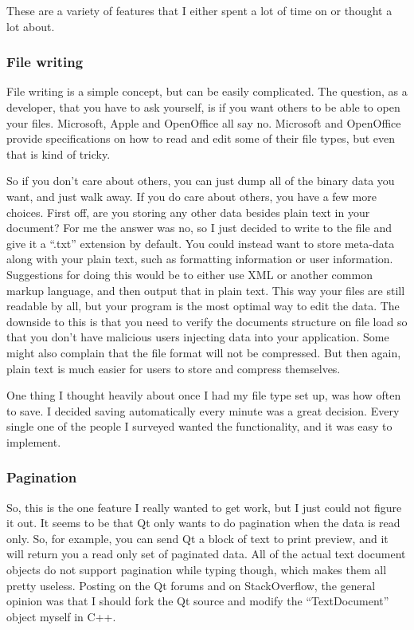\documentclass[10pt]{article}
\begin{document}
These are a variety of features that I either spent a lot of time on or thought a lot about.

\subsubsection{File writing}

File writing is a simple concept, but can be easily complicated. The question, as a developer, that you have to ask yourself, is if you want others to be able to open your files. Microsoft, Apple and OpenOffice all say no. Microsoft and OpenOffice provide specifications on how to read and edit some of their file types, but even that is kind of tricky.

So if you don't care about others, you can just dump all of the binary data you want, and just walk away. If you do care about others, you have a few more choices. First off, are you storing any other data besides plain text in your document? For me the answer was no, so I just decided to write to the file and give it a ``.txt'' extension by default. You could instead want to store meta-data along with your plain text, such as formatting information or user information. Suggestions for doing this would be to either use XML or another common markup language, and then output that in plain text. This way your files are still readable by all, but your program is the most optimal way to edit the data. The downside to this is that you need to verify the documents structure on file load so that you don't have malicious users injecting data into your application. Some might also complain that the file format will not be compressed. But then again, plain text is much easier for users to store and compress themselves.

One thing I thought heavily about once I had my file type set up, was how often to save. I decided saving automatically every minute was a great decision. Every single one of the people I surveyed wanted the functionality, and it was easy to implement.

\subsubsection{Pagination}

So, this is the one feature I really wanted to get work, but I just could not figure it out. It seems to be that Qt only wants to do pagination when the data is read only. So, for example, you can send Qt a block of text to print preview, and it will return you a read only set of paginated data. All of the actual text document objects do not support pagination while typing though, which makes them all pretty useless. Posting on the Qt forums and on StackOverflow, the general opinion was that I should fork the Qt source and modify the ``TextDocument'' object myself in C++.
\end{document}
